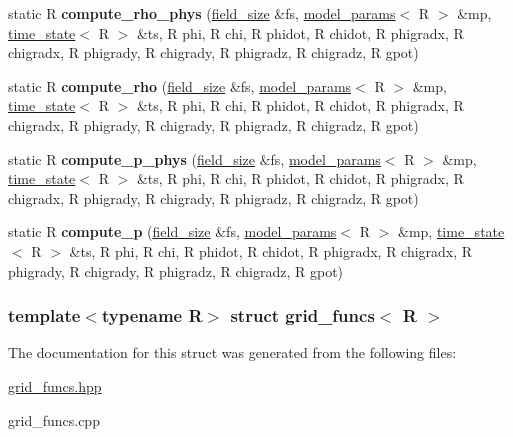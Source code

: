 \begin{DoxyCompactItemize}
\item 
\hypertarget{structgrid__funcs_ac4df165d371e6e6a389d165ac4586644}{
static R {\bfseries compute\_\-rho\_\-phys} (\hyperlink{structfield__size}{field\_\-size} \&fs, \hyperlink{structmodel__params}{model\_\-params}$<$ R $>$ \&mp, \hyperlink{structtime__state}{time\_\-state}$<$ R $>$ \&ts, R phi, R chi, R phidot, R chidot, R phigradx, R chigradx, R phigrady, R chigrady, R phigradz, R chigradz, R gpot)}
\label{structgrid__funcs_ac4df165d371e6e6a389d165ac4586644}

\item 
\hypertarget{structgrid__funcs_ad043dc382653a8a220ab034304fa20c4}{
static R {\bfseries compute\_\-rho} (\hyperlink{structfield__size}{field\_\-size} \&fs, \hyperlink{structmodel__params}{model\_\-params}$<$ R $>$ \&mp, \hyperlink{structtime__state}{time\_\-state}$<$ R $>$ \&ts, R phi, R chi, R phidot, R chidot, R phigradx, R chigradx, R phigrady, R chigrady, R phigradz, R chigradz, R gpot)}
\label{structgrid__funcs_ad043dc382653a8a220ab034304fa20c4}

\item 
\hypertarget{structgrid__funcs_a67cb4b4748f1f30c063476a4ba5dbacf}{
static R {\bfseries compute\_\-p\_\-phys} (\hyperlink{structfield__size}{field\_\-size} \&fs, \hyperlink{structmodel__params}{model\_\-params}$<$ R $>$ \&mp, \hyperlink{structtime__state}{time\_\-state}$<$ R $>$ \&ts, R phi, R chi, R phidot, R chidot, R phigradx, R chigradx, R phigrady, R chigrady, R phigradz, R chigradz, R gpot)}
\label{structgrid__funcs_a67cb4b4748f1f30c063476a4ba5dbacf}

\item 
\hypertarget{structgrid__funcs_a354bdaa015579f869fa06af4b3c90039}{
static R {\bfseries compute\_\-p} (\hyperlink{structfield__size}{field\_\-size} \&fs, \hyperlink{structmodel__params}{model\_\-params}$<$ R $>$ \&mp, \hyperlink{structtime__state}{time\_\-state}$<$ R $>$ \&ts, R phi, R chi, R phidot, R chidot, R phigradx, R chigradx, R phigrady, R chigrady, R phigradz, R chigradz, R gpot)}
\label{structgrid__funcs_a354bdaa015579f869fa06af4b3c90039}

\end{DoxyCompactItemize}
\subsubsection*{template$<$typename R$>$ struct grid\_\-funcs$<$ R $>$}



The documentation for this struct was generated from the following files:\begin{DoxyCompactItemize}
\item 
\hyperlink{grid__funcs_8hpp}{grid\_\-funcs.hpp}\item 
grid\_\-funcs.cpp\end{DoxyCompactItemize}
